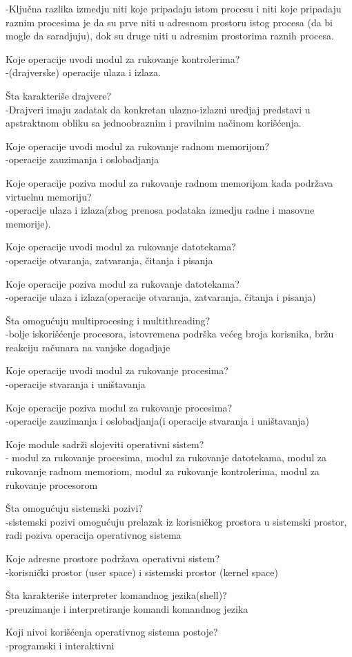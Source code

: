 \documentclass{article}
\begin{document}
-Ključna razlika izmedju niti koje pripadaju istom procesu i niti
koje pripadaju raznim procesima je da su prve niti u adresnom prostoru istog procesa (da
bi mogle da saradjuju), dok su druge niti u adresnim prostorima raznih procesa.
\item Koje operacije uvodi modul za rukovanje kontrolerima?\\
-(drajverske) operacije ulaza i izlaza.
\item Šta karakteriše drajvere?\\
-Drajveri imaju zadatak da konkretan ulazno-izlazni uredjaj predstavi u
apstraktnom obliku sa jednoobraznim i pravilnim načinom korišćenja.
\item Koje operacije uvodi modul za rukovanje radnom memorijom?\\
-operacije zauzimanja i oslobadjanja
\item Koje operacije poziva modul za rukovanje radnom memorijom kada podržava
virtuelnu memoriju?\\
-operacije ulaza i izlaza(zbog prenosa podataka izmedju radne i masovne memorije).
\item Koje operacije uvodi modul za rukovanje datotekama?\\
-operacije otvaranja, zatvaranja, čitanja i pisanja
\item Koje operacije poziva modul za rukovanje datotekama?\\
-operacije ulaza i izlaza(operacije otvaranja, zatvaranja, čitanja i pisanja)
\item Šta omogućuju multiprocesing i multithreading?\\
-bolje iskorišćenje procesora, istovremena podrška većeg broja korisnika, 
bržu reakciju računara na vanjske dogadjaje
\item Koje operacije uvodi modul za rukovanje procesima?\\
-operacije stvaranja i uništavanja
\item Koje operacije poziva modul za rukovanje procesima?\\
-operacije zauzimanja i oslobadjanja(i operacije stvaranja i uništavanja)
\item Koje module sadrži slojeviti operativni sistem?\\
- modul za rukovanje procesima, modul za rukovanje datotekama, modul za 
rukovanje radnom memoriom, modul za rukovanje kontrolerima, modul za rukovanje procesorom
\item Šta omogućuju sistemski pozivi?\\
-sistemski pozivi omogućuju prelazak iz korisničkog prostora u sistemski prostor,
radi poziva operacija operativnog sistema
\item Koje adresne prostore podržava operativni sistem?\\
-korisnički prostor (user space) i sistemski prostor (kernel space)
\item Šta karakteriše interpreter komandnog jezika(shell)?\\
-preuzimanje i interpretiranje komandi komandnog jezika
\item Koji nivoi korišćenja operativnog sistema postoje?\\
-programski i interaktivni
\enumerate{}
\end{document}
